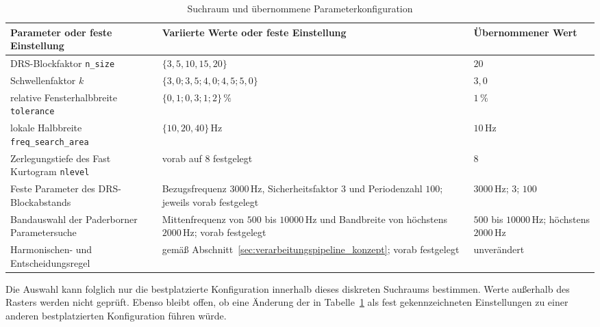 \begin{table}[htbp]
  \centering
  \caption{Suchraum und übernommene Parameterkonfiguration}
  \label{tab:parametrierung_suchraum}
  \begin{tabularx}{\textwidth}{|
      >{\footnotesize\raggedright\arraybackslash}p{4.0cm}|
      >{\footnotesize\raggedright\arraybackslash}X|
      >{\footnotesize\raggedright\arraybackslash}p{3.0cm}|}
    \hline
    \textbf{Parameter oder feste Einstellung} &
    \textbf{Variierte Werte oder feste Einstellung} &
    \textbf{Übernommener Wert} \\
    \hline
    DRS-Blockfaktor \texttt{n\_size} &
    $\{3, 5, 10, 15, 20\}$ &
    $20$ \\
    \hline
    Schwellenfaktor $k$ &
    $\{3{,}0; 3{,}5; 4{,}0; 4{,}5; 5{,}0\}$ &
    $3{,}0$ \\
    \hline
    relative Fensterhalbbreite \texttt{tolerance} &
    $\{0{,}1; 0{,}3; 1; 2\}\,\%$ &
    $1\,\%$ \\
    \hline
    lokale Halbbreite \texttt{freq\_search\_area} &
    $\{10, 20, 40\}\,\mathrm{Hz}$ &
    $10\,\mathrm{Hz}$ \\
    \hline
    Zerlegungstiefe des Fast Kurtogram \texttt{nlevel} &
    vorab auf $8$ festgelegt &
    $8$ \\
    \hline
    Feste Parameter des DRS-Blockabstands &
    Bezugsfrequenz $3000\,\mathrm{Hz}$, Sicherheitsfaktor $3$ und
    Periodenzahl $100$; jeweils vorab festgelegt &
    $3000\,\mathrm{Hz}$; $3$; $100$ \\
    \hline
    Bandauswahl der Paderborner Parametersuche &
    Mittenfrequenz von $500$ bis $10000\,\mathrm{Hz}$ und Bandbreite von
    höchstens $2000\,\mathrm{Hz}$; vorab festgelegt &
    $500$ bis $10000\,\mathrm{Hz}$; höchstens $2000\,\mathrm{Hz}$ \\
    \hline
    Harmonischen- und Entscheidungsregel &
    gemäß Abschnitt~\ref{sec:verarbeitungspipeline_konzept}; vorab
    festgelegt &
    unverändert \\
    \hline
  \end{tabularx}
\end{table}

Die Auswahl kann folglich nur die bestplatzierte Konfiguration innerhalb
dieses diskreten Suchraums bestimmen. Werte außerhalb des Rasters werden nicht
geprüft. Ebenso bleibt offen, ob eine Änderung der in
Tabelle~\ref{tab:parametrierung_suchraum} als fest gekennzeichneten
Einstellungen zu einer anderen bestplatzierten Konfiguration führen würde.

